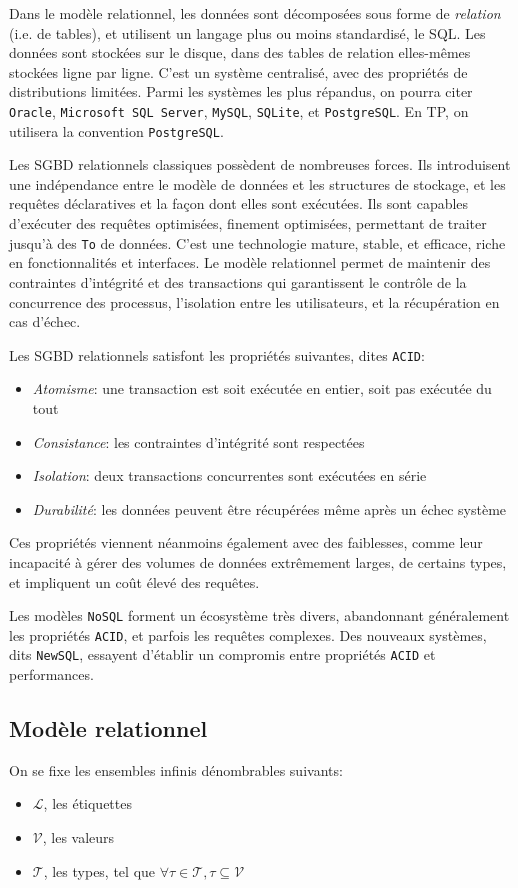 \documentclass[french, toc]{../cs-classes/cs-classes}
\renewcommand*{\L}{\mathcal{L}}
\newcommand*{\V}{\mathcal{V}}
\newcommand*{\T}{\mathcal{T}}
\begin{document}
Dans le modèle relationnel, les données sont décomposées sous forme de \emph{relation} (i.e. de tables), et utilisent un langage plus ou moins standardisé, le SQL. Les données sont stockées sur le disque, dans des tables de relation elles-mêmes stockées ligne par ligne. C'est un système centralisé, avec des propriétés de distributions limitées. Parmi les systèmes les plus répandus, on pourra citer \texttt{Oracle}, \texttt{Microsoft SQL Server}, \texttt{MySQL}, \texttt{SQLite}, et \texttt{PostgreSQL}. En TP, on utilisera la convention \texttt{PostgreSQL}.

Les SGBD relationnels classiques possèdent de nombreuses forces. Ils introduisent une indépendance entre le modèle de données et les structures de stockage, et les requêtes déclaratives et la façon dont elles sont exécutées. Ils sont capables d'exécuter des requêtes optimisées, finement optimisées, permettant de traiter jusqu'à des \texttt{To} de données. C'est une technologie mature, stable, et efficace, riche en fonctionnalités et interfaces. Le modèle relationnel permet de maintenir des contraintes d'intégrité et des transactions qui garantissent le contrôle de la concurrence des processus, l'isolation entre les utilisateurs, et la récupération en cas d'échec.

Les SGBD relationnels satisfont les propriétés suivantes, dites \texttt{ACID}:
\begin{itemize}
    \item \emph{Atomisme}: une transaction est soit exécutée en entier, soit pas exécutée du tout
    \item \emph{Consistance}: les contraintes d'intégrité sont respectées
    \item \emph{Isolation}: deux transactions concurrentes sont exécutées en série
    \item \emph{Durabilité}: les données peuvent être récupérées même après un échec système
\end{itemize}
Ces propriétés viennent néanmoins également avec des faiblesses, comme leur incapacité à gérer des volumes de données extrêmement larges, de certains types, et impliquent un coût élevé des requêtes.

Les modèles \texttt{NoSQL} forment un écosystème très divers, abandonnant généralement les propriétés \texttt{ACID}, et parfois les requêtes complexes. Des nouveaux systèmes, dits \texttt{NewSQL}, essayent d'établir un compromis entre propriétés \texttt{ACID} et performances.

\subsection{Modèle relationnel}
On se fixe les ensembles infinis dénombrables suivants:
\begin{itemize}
    \item $\L$, les étiquettes
    \item $\V$, les valeurs
    \item $\T$, les types, tel que $\forall\tau\in\T, \tau\subseteq\V$
\end{itemize}
\end{document}
